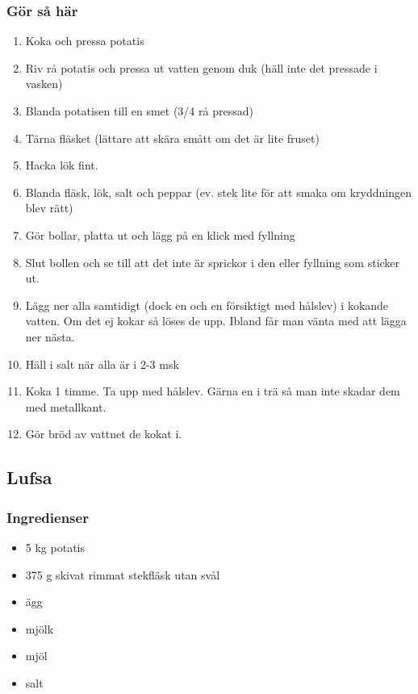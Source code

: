 \documentclass[a4paper,11pt,twocolumn]{article}
\begin{document}
\subsubsection*{Gör så här}
\begin{enumerate}[label=\arabic*.]
    \item Koka och pressa potatis
    \item Riv rå potatis och pressa ut vatten genom duk (häll inte det pressade i vasken)
    \item Blanda potatisen till en smet (3/4 rå pressad)
    \item Tärna fläsket (lättare att skära smått om det är lite fruset)
    \item Hacka lök fint.
    \item Blanda fläsk, lök, salt och peppar (ev. stek lite för att smaka om kryddningen blev rätt)
    \item Gör bollar, platta ut och lägg på en klick med fyllning
    \item Slut bollen och se till att det inte är sprickor i den eller fyllning som sticker ut.
    \item Lägg ner alla samtidigt (dock en och en försiktigt med hålslev) i kokande vatten. Om det ej kokar så löses de upp. Ibland får man vänta med att lägga ner nästa.
    \item Häll i salt när alla är i 2-3 msk
    \item Koka 1 timme. Ta upp med hålslev. Gärna en i trä så man inte skadar dem med metallkant.
    \item Gör bröd av vattnet de kokat i.
\end{enumerate}


\subsection{Lufsa}
\subsubsection*{Ingredienser}
\begin{itemize}[noitemsep]
    \item 5 kg potatis
    \item 375 g skivat rimmat stekfläsk utan svål
    \item ägg
    \item mjölk
    \item mjöl
    \item salt
\end{itemize}
\end{document}
